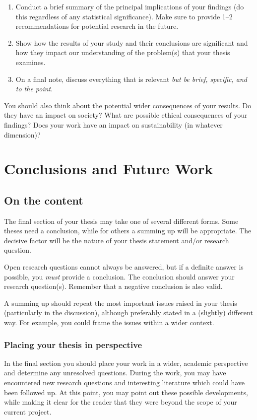 \documentclass[a4paper,twoside]{bth}
\begin{document}
\begin{enumerate}
    \item Conduct a brief summary of the principal implications of your findings (do this regardless of any statistical significance). Make sure to provide 1--2 recommendations for potential research in the future.
    \item Show how the results of your study and their conclusions are significant and how they impact our understanding of the problem(s) that your thesis examines.
    \item On a final note, discuss everything that is relevant \emph{but be brief, specific, and to the point}.
\end{enumerate}


You should also think about the potential wider consequences of your results. Do they have an impact on society? What are possible ethical consequences of your findings? Does your work have an impact on sustainability (in whatever dimension)?

\chapter{Conclusions and Future Work}
\label{chp:conclusions}
\section{On the content}
The final section of your thesis may take one of several different forms. Some theses need a conclusion, while for others a summing up will be appropriate. The decisive factor will be the nature of your thesis statement and/or research question.

Open research questions cannot always be answered, but if a definite answer is possible, you \emph{must} provide a conclusion. The conclusion should answer your research question(s). Remember that a negative conclusion is also valid.

A summing up should repeat the most important issues raised in your thesis (particularly in the discussion), although preferably stated in a (slightly) different way. For example, you could frame the issues within a wider context.

\subsection{Placing your thesis in perspective}
In the final section you should place your work in a wider, academic perspective and determine any unresolved questions. During the work, you may have encountered new research questions and interesting literature which could have been followed up. At this point, you may point out these possible developments, while making it clear for the reader that they were beyond the scope of your current project.
\end{document}

